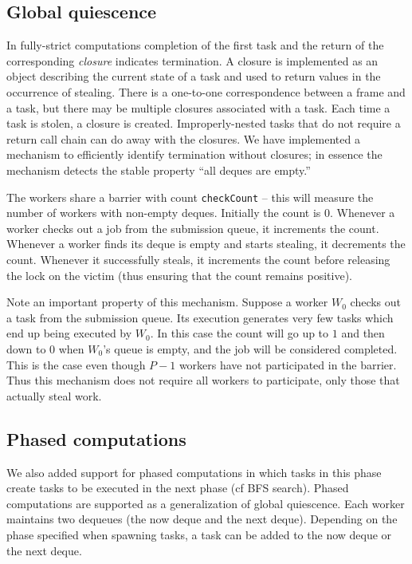 \subsection{Global quiescence}

In fully-strict computations completion of the first task and the
return of the corresponding {\em closure} indicates termination. A closure is implemented as an object describing the current state of a task and used to return values in the occurrence of stealing. There is a one-to-one correspondence between a frame and a task, but there may be multiple closures associated with a task. Each time a task is stolen, a closure is created. 
Improperly-nested tasks that do not require a return call chain can do
away with the closures. We have implemented a mechanism to efficiently
identify termination without closures; in essence the mechanism detects
the stable property ``all deques are empty.'' 

The workers share a barrier with count {\tt checkCount} -- this will
measure the number of workers with non-empty deques.  Initially the
count is $0$. Whenever a worker checks out a job from the submission
queue, it increments the count. Whenever a worker finds its deque is
empty and starts stealing, it decrements the count. Whenever it
successfully steals, it increments the count before releasing the lock
on the victim (thus ensuring that the count remains positive).

Note an important property of this mechanism. Suppose a worker $W_0$
checks out a task from the submission queue. Its execution generates
very few tasks which end up being executed by $W_0$. In this case the
count will go up to $1$ and then down to $0$ when $W_0$'s queue is
empty, and the job will be considered completed. This is the case even
though $P-1$ workers have not participated in the barrier. Thus this
mechanism does not require all workers to participate, only those that
actually steal work.

\subsection{Phased computations}
We also added support for phased computations in which tasks in this
phase create tasks to be executed in the next phase (cf BFS search).
Phased computations are supported as a generalization of global
quiescence. Each worker maintains two dequeues (the now deque and the
next deque).  Depending on the phase specified when spawning
tasks, a task can be added to the now deque or the next deque.

